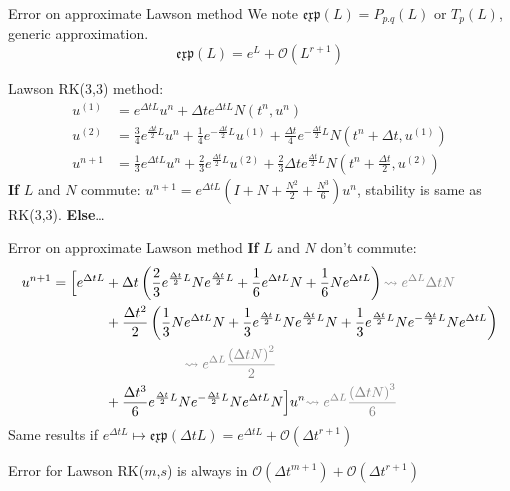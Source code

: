 \documentclass{beamer}
\newcommand{\mbold}[1]{{\textbf{\color{PLB}#1}}}
\begin{document}
\begin{frame}{Error on approximate Lawson method}
  We note $\mathfrak{exp}(L) = P_{p.q}(L)$ or $T_p(L)$, generic approximation.
  $$\mathfrak{exp}(L) = e^L + \mathcal{O}(L^{r+1})$$

  Lawson RK(3,3) method:
  $$
    \begin{aligned}
      u^{(1)} &= e^{\Delta t L}u^n + \Delta te^{\Delta t L}N(t^n,u^n) \\
      u^{(2)} &= \frac{3}{4}e^{\frac{\Delta t}{2} L}u^n + \frac{1}{4}e^{-\frac{\Delta t}{2} L}u^{(1)} + \frac{\Delta t}{4}e^{-\frac{\Delta t}{2} L} N(t^n+\Delta t,u^{(1)}) \\
      u^{n+1} &= \frac{1}{3}e^{\Delta t L}u^n + \frac{2}{3}e^{\frac{\Delta t}{2} L}u^{(2)} + \frac{2}{3}\Delta t e^{\frac{\Delta t}{2} L} N(t^n+\frac{\Delta t}{2},u^{(2)})
    \end{aligned}
  $$
  \mbold{If} $L$ and $N$ commute: $u^{n+1} = e^{\Delta tL}\left(I + N + \frac{N^2}{2} + \frac{N^3}{6} \right)u^n$, stability is same as RK(3,3). \mbold{Else}\dots
\end{frame}
\begin{frame}{Error on approximate Lawson method}
  \mbold{If} $L$ and $N$ don't commute:
  $$
    \begin{aligned}
      u^{n+1} = \Big[ e^{\Delta tL}
        &+\Delta t\left(\frac{2}{3}e^{\frac{\Delta t}{2}L}Ne^{\frac{\Delta t}{2}L}+\frac{1}{6}e^{\Delta tL}N + \frac{1}{6}Ne^{\Delta tL}\right)
          \textcolor{gris}{\rightsquigarrow e^{\Delta L}\Delta t N} \\
        & + \frac{\Delta t^2}{2}\left(\frac{1}{3}Ne^{\Delta tL}N + \frac{1}{3}e^{\frac{\Delta t}{2}L}Ne^{\frac{\Delta t}{2}L}N + \frac{1}{3} e^{\frac{\Delta t}{2}L}Ne^{-\frac{\Delta t}{2}L}Ne^{\Delta tL} \right) \\
          &\hspace{2cm} \textcolor{gris}{\rightsquigarrow e^{\Delta L}\frac{\left(\Delta t N\right)^2}{2}} \\
      & + \frac{\Delta t^3}{6}e^{\frac{\Delta t}{2}L}Ne^{-\frac{\Delta t}{2}L}Ne^{\Delta tL}N \Big]u^n \textcolor{gris}{\rightsquigarrow e^{\Delta L}\frac{\left(\Delta t N\right)^3}{6}}
    \end{aligned}
  $$
  Same results if $e^{\Delta t L}\mapsto \mathfrak{exp}(\Delta t L) = e^{\Delta t L} + \mathcal{O}(\Delta t^{r+1})$

  \begin{lemma}
    Error for Lawson RK($m$,$s$) is always in $\mathcal{O}(\Delta t^{m+1})+\mathcal{O}(\Delta t^{r+1})$
  \end{lemma}
\end{frame}
\end{document}
